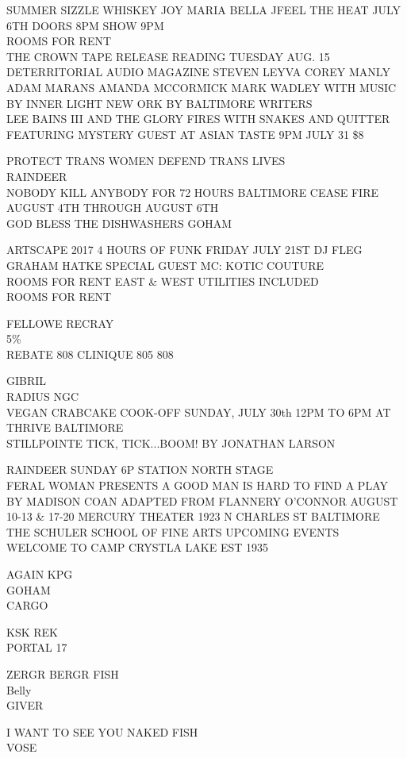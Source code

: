 \documentclass[10pt,letterpaper]{article}
\begin{document}
SUMMER SIZZLE WHISKEY JOY MARIA BELLA JFEEL THE HEAT JULY 6TH DOORS 8PM SHOW 9PM\\
ROOMS FOR RENT\\
THE CROWN TAPE RELEASE READING TUESDAY AUG. 15 DETERRITORIAL AUDIO MAGAZINE STEVEN LEYVA COREY MANLY ADAM MARANS AMANDA MCCORMICK MARK WADLEY WITH MUSIC BY INNER LIGHT NEW ORK BY BALTIMORE WRITERS\\
LEE BAINS III AND THE GLORY FIRES WITH SNAKES AND QUITTER FEATURING MYSTERY GUEST AT ASIAN TASTE 9PM JULY 31 \$8

PROTECT TRANS WOMEN DEFEND TRANS LIVES\\
RAINDEER\\
NOBODY KILL ANYBODY FOR 72 HOURS BALTIMORE CEASE FIRE AUGUST 4TH THROUGH AUGUST 6TH\\
GOD BLESS THE DISHWASHERS GOHAM

ARTSCAPE 2017 4 HOURS OF FUNK FRIDAY JULY 21ST DJ FLEG GRAHAM HATKE SPECIAL GUEST MC: KOTIC COUTURE\\
ROOMS FOR RENT EAST \& WEST UTILITIES INCLUDED\\
ROOMS FOR RENT

FELLOWE RECRAY\\
5\%\\
REBATE 808 CLINIQUE 805 808

GIBRIL\\
RADIUS NGC\\
VEGAN CRABCAKE COOK{-}OFF SUNDAY, JULY 30th 12PM TO 6PM AT THRIVE BALTIMORE\\
STILLPOINTE TICK, TICK...BOOM!  BY JONATHAN LARSON

RAINDEER SUNDAY 6P STATION NORTH STAGE\\
FERAL WOMAN PRESENTS A GOOD MAN IS HARD TO FIND A PLAY BY MADISON COAN ADAPTED FROM FLANNERY O'CONNOR AUGUST 10{-}13 \& 17{-}20 MERCURY THEATER 1923 N CHARLES ST BALTIMORE\\
THE SCHULER SCHOOL OF FINE ARTS UPCOMING EVENTS\\
WELCOME TO CAMP CRYSTLA LAKE EST 1935

AGAIN KPG\\
GOHAM\\
CARGO

KSK REK\\
PORTAL 17

ZERGR BERGR FISH\\
Belly\\
GIVER

I WANT TO SEE YOU NAKED FISH\\
VOSE
\end{document}
